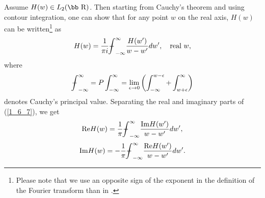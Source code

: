 \documentclass[journal,twoside]{IEEEtran}
\begin{document}
Assume   $H(w)\in L_2({\hbox{\bb R}})$. Then starting from Cauchy's theorem and using contour integration, one can show \cite{Nussenzveig_1972} that for any point $w$ on the real axis, $H(w)$ can be written\footnote{Please note that we use an opposite sign of the exponent in the definition of the Fourier transform than in \cite{Nussenzveig_1972}.} as
\begin{equation} \label{1_6_7}
H(w)=\frac{1}{\pi i}{{\mathchoice
   {{{\setbox0=\hbox{$\displaystyle{\textstyle{-}}{\int}$}
     \vcenter{\hbox{$\textstyle{-}$}}\kern-.5\wd0}}}   {{{\setbox0=\hbox{$\textstyle{\scriptstyle{-}}{\int}$}
     \vcenter{\hbox{$\scriptstyle{-}$}}\kern-.5\wd0}}}   {{{\setbox0=\hbox{$\scriptstyle{\scriptscriptstyle{-}}{\int}$}
     \vcenter{\hbox{$\scriptscriptstyle{-}$}}\kern-.5\wd0}}}   {{{\setbox0=\hbox{$\scriptscriptstyle{\scriptscriptstyle{-}}{\int}$}
     \vcenter{\hbox{$\scriptscriptstyle{-}$}}\kern-.5\wd0}}}   \!\int}}_{-\infty}^\infty \frac{H(w')}{w-w'}dw', \quad \mbox{real} \ w,
\end{equation}
where 
\[
{{\mathchoice
   {{{\setbox0=\hbox{$\displaystyle{\textstyle{-}}{\int}$}
     \vcenter{\hbox{$\textstyle{-}$}}\kern-.5\wd0}}}   {{{\setbox0=\hbox{$\textstyle{\scriptstyle{-}}{\int}$}
     \vcenter{\hbox{$\scriptstyle{-}$}}\kern-.5\wd0}}}   {{{\setbox0=\hbox{$\scriptstyle{\scriptscriptstyle{-}}{\int}$}
     \vcenter{\hbox{$\scriptscriptstyle{-}$}}\kern-.5\wd0}}}   {{{\setbox0=\hbox{$\scriptscriptstyle{\scriptscriptstyle{-}}{\int}$}
     \vcenter{\hbox{$\scriptscriptstyle{-}$}}\kern-.5\wd0}}}   \!\int}}_{-\infty}^\infty=P\int_{-\infty}^\infty = \lim_{\epsilon\to 0}\left(\int_{-\infty}^{w-\epsilon}+\int_{w+\epsilon}^{\infty}\right)
\]
denotes Cauchy's principal value. Separating the real and imaginary parts of (\ref{1_6_7}), we get
\begin{equation} \label{1_6_10}
{\mathop{\rm Re}\nolimits} H(w)=\frac{1}{\pi}{{\mathchoice
   {{{\setbox0=\hbox{$\displaystyle{\textstyle{-}}{\int}$}
     \vcenter{\hbox{$\textstyle{-}$}}\kern-.5\wd0}}}   {{{\setbox0=\hbox{$\textstyle{\scriptstyle{-}}{\int}$}
     \vcenter{\hbox{$\scriptstyle{-}$}}\kern-.5\wd0}}}   {{{\setbox0=\hbox{$\scriptstyle{\scriptscriptstyle{-}}{\int}$}
     \vcenter{\hbox{$\scriptscriptstyle{-}$}}\kern-.5\wd0}}}   {{{\setbox0=\hbox{$\scriptscriptstyle{\scriptscriptstyle{-}}{\int}$}
     \vcenter{\hbox{$\scriptscriptstyle{-}$}}\kern-.5\wd0}}}   \!\int}}_{-\infty}^\infty \frac{{\mathop{\rm Im}\nolimits} H(w')}{w-w'}dw',
\end{equation}
\begin{equation} \label{1_6_11}
{\mathop{\rm Im}\nolimits} H(w)=-\frac{1}{\pi}{{\mathchoice
   {{{\setbox0=\hbox{$\displaystyle{\textstyle{-}}{\int}$}
     \vcenter{\hbox{$\textstyle{-}$}}\kern-.5\wd0}}}   {{{\setbox0=\hbox{$\textstyle{\scriptstyle{-}}{\int}$}
     \vcenter{\hbox{$\scriptstyle{-}$}}\kern-.5\wd0}}}   {{{\setbox0=\hbox{$\scriptstyle{\scriptscriptstyle{-}}{\int}$}
     \vcenter{\hbox{$\scriptscriptstyle{-}$}}\kern-.5\wd0}}}   {{{\setbox0=\hbox{$\scriptscriptstyle{\scriptscriptstyle{-}}{\int}$}
     \vcenter{\hbox{$\scriptscriptstyle{-}$}}\kern-.5\wd0}}}   \!\int}}_{-\infty}^\infty \frac{{\mathop{\rm Re}\nolimits} H(w')}{w-w'}dw'.
\end{equation}
\end{document}
